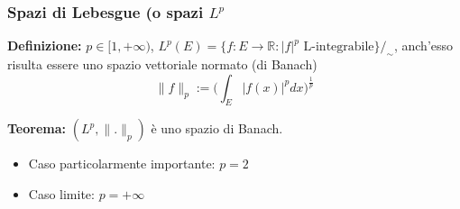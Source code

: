 \documentclass[a4paper]{article}
\newcommand{\R}{\mathbb{R}}
\begin{document}
\subsubsection{Spazi di Lebesgue (o spazi $L^p$}
\begin{tcolorbox}
	\textbf{Definizione:} $p\in[1,+\infty)$, $L^p(E)=\{f:E\to \R:|f|^p\text{ L-integrabile}\}/_{\sim}$, anch'esso risulta essere uno spazio vettoriale normato (di Banach)
	\[\|f\|_p:=\bigg(\int_{E}^{} |f(x)|^pdx\bigg)^{\frac{1}{p}}\] 
\end{tcolorbox}
\begin{tcolorbox}
	\textbf{Teorema:} $(L^p,\|.\|_p)$ è uno spazio di Banach.
\end{tcolorbox}
\begin{itemize}
	\item Caso particolarmente importante: $p=2$
	\item Caso limite: $p=+\infty$
\end{itemize}
\end{document}
